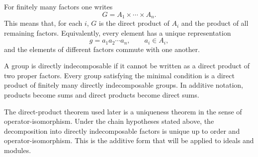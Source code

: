 \documentclass[
  12pt,
]{article}
\begin{document}
For finitely many factors one writes \[
  G=A_1\times\cdots\times A_n.
\] This means that, for each \(i\), \(G\) is the direct product of
\(A_i\) and the product of all remaining factors. Equivalently, every
element has a unique representation \[
  g=a_1a_2\cdots a_n,
  \qquad a_i\in A_i,
\] and the elements of different factors commute with one another.

A group is directly indecomposable if it cannot be written as a direct
product of two proper factors. Every group satisfying the minimal
condition is a direct product of finitely many directly indecomposable
groups. In additive notation, products become sums and direct products
become direct sums.

The direct-product theorem used later is a uniqueness theorem in the
sense of operator-isomorphism. Under the chain hypotheses stated above,
the decomposition into directly indecomposable factors is unique up to
order and operator-isomorphism. This is the additive form that will be
applied to ideals and modules.
\end{document}

